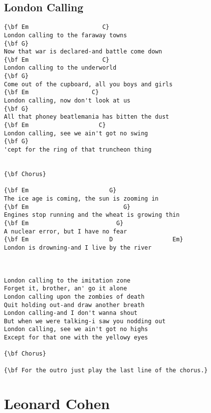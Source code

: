 \documentclass[a4paper]{article}
\begin{document}
\subsection{London Calling} %
\label{sub:London Calling}
\begin{Verbatim}[commandchars=\\\{\}]
{\bf Em                     C}
London calling to the faraway towns
{\bf G}
Now that war is declared-and battle come down
{\bf Em                     C}
London calling to the underworld
{\bf G}
Come out of the cupboard, all you boys and girls
{\bf Em                  C}
London calling, now don't look at us
{\bf G}
All that phoney beatlemania has bitten the dust
{\bf Em                    C}
London calling, see we ain't got no swing
{\bf G}
'cept for the ring of that truncheon thing


{\bf Chorus}

{\bf Em                       G}
The ice age is coming, the sun is zooming in
{\bf Em                           G}
Engines stop running and the wheat is growing thin
{\bf Em                         G}
A nuclear error, but I have no fear
{\bf Em                       D                 Em}
London is drowning-and I live by the river



London calling to the imitation zone
Forget it, brother, an' go it alone
London calling upon the zombies of death
Quit holding out-and draw another breath
London calling-and I don't wanna shout
But when we were talking-i saw you nodding out
London calling, see we ain't got no highs
Except for that one with the yellowy eyes

{\bf Chorus}

{\bf For the outro just play the last line of the chorus.}
\end{Verbatim}
\newpage
\section{Leonard Cohen} %
\label{sec:Leonard Cohe}
\end{document}
